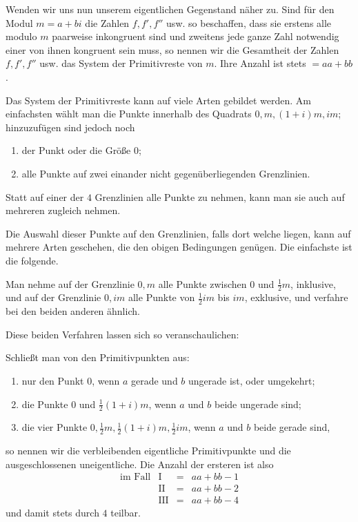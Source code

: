 Wenden wir uns nun unserem eigentlichen Gegenstand näher zu. Sind für den Modul $m=a+bi$ die Zahlen $f,f',f''$ usw. so beschaffen, dass sie erstens alle modulo $m$ paarweise inkongruent sind und zweitens jede ganze Zahl notwendig einer von ihnen kongruent sein muss, so nennen wir die
Gesamtheit der Zahlen $f,f',f''$ usw. das System der Primitivreste von $m$. Ihre Anzahl ist stets $=aa+bb$.

Das System der Primitivreste kann auf viele Arten gebildet werden. Am einfachsten wählt man die Punkte innerhalb des Quadrats $0,m,(1+i)m,im$; hinzuzufügen sind jedoch noch
\begin{enumerate}
\item[I.] der Punkt oder die Größe $0$;
\item[II.] alle Punkte auf zwei einander nicht gegenüberliegenden Grenzlinien.
\end{enumerate}
Statt auf einer der $4$ Grenzlinien alle Punkte zu nehmen, kann man sie auch auf mehreren zugleich nehmen.

Die Auswahl dieser Punkte auf den Grenzlinien, falls dort welche liegen, kann auf mehrere Arten geschehen, die den obigen Bedingungen genügen. Die einfachste ist die folgende.

Man nehme auf der Grenzlinie $0,m$ alle Punkte zwischen $0$ und $\frac12m$, inklusive, und auf der Grenzlinie $0,im$ alle Punkte von $\frac12im$ bis $im$, exklusive, und verfahre bei den beiden anderen ähnlich.

Diese beiden Verfahren lassen sich so veranschaulichen:
\begin{center}\resizebox{.85\textwidth}{!}{}\end{center}

Schließt man von den Primitivpunkten aus:
\begin{enumerate}
\item[I.] nur den Punkt $0$, wenn $a$ gerade und $b$ ungerade ist, oder umgekehrt;
\item[II.] die Punkte $0$ und $\frac12(1+i)m$, wenn $a$ und $b$ beide ungerade sind;
\item[III.] die vier Punkte $0,\frac12m,\frac12(1+i)m,\frac12im$, wenn $a$ und $b$ beide gerade sind,
\end{enumerate}
so nennen wir die verbleibenden eigentliche Primitivpunkte und die ausgeschlossenen uneigentliche. Die Anzahl der ersteren ist also
\[
\begin{array}{rrcl}
\text{im Fall}&\mathrm{I}&=&aa+bb-1\\
&\mathrm{II}&=&aa+bb-2\\
&\mathrm{III}&=&aa+bb-4
\end{array}
\]
und damit stets durch $4$ teilbar.

